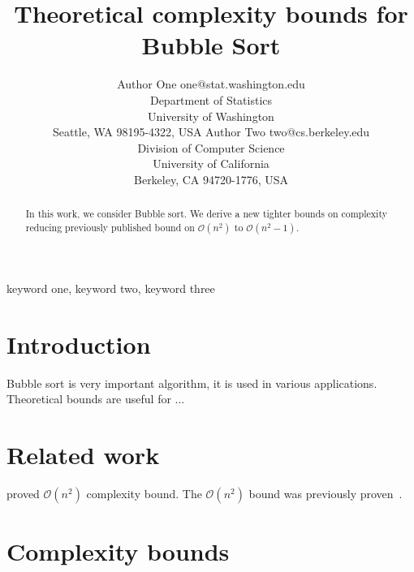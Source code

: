 \documentclass[twoside,11pt]{article}
\begin{document}
\title{Theoretical complexity bounds for Bubble Sort}

\author{\name Author One \email one@stat.washington.edu \\
       \addr Department of Statistics\\
       University of Washington\\
       Seattle, WA 98195-4322, USA
       \AND
       \name Author Two \email two@cs.berkeley.edu \\
       \addr Division of Computer Science\\
       University of California\\
       Berkeley, CA 94720-1776, USA}


\maketitle

\begin{abstract}%
In this work, we consider Bubble sort. We derive a new tighter bounds on complexity reducing previously published bound on $\mathcal{O}(n^2)$ to $\mathcal{O}(n^2 - 1)$.
\end{abstract}

\begin{keywords}
  keyword one, keyword two, keyword three
\end{keywords}

\section{Introduction} %

Bubble sort is very important algorithm, it is used in various applications. Theoretical bounds are useful for ...

\section{Related work}

\cite{astrachan2003bubble} proved $\mathcal{O}(n^2)$ complexity bound.
The $\mathcal{O}(n^2)$ bound was previously proven~\citep{astrachan2003bubble}.

\section{Complexity bounds}
\end{document}
